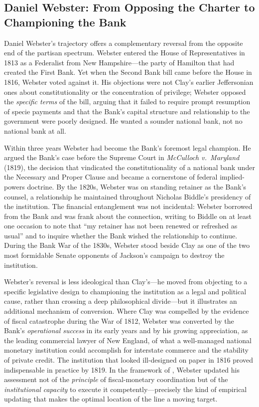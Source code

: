 \documentclass[12pt]{article}
\begin{document}
\subsection{Daniel Webster: From Opposing the Charter to Championing
             the Bank}

Daniel Webster's trajectory offers a complementary reversal from the
opposite end of the partisan spectrum.  Webster entered the House of
Representatives in 1813 as a Federalist from New Hampshire---the party
of Hamilton that had created the First Bank.  Yet when the Second Bank
bill came before the House in 1816, Webster voted against it.  His
objections were not Clay's earlier Jeffersonian ones about
constitutionality or the concentration of privilege; Webster opposed the
\emph{specific terms} of the bill, arguing that it failed to require
prompt resumption of specie payments and that the Bank's capital
structure and relationship to the government were poorly designed.  He
wanted a sounder national bank, not no national bank at all.

Within three years Webster had become the Bank's foremost legal
champion.  He argued the Bank's case before the Supreme Court in
\textit{McCulloch v.~Maryland} (1819), the decision that vindicated
the constitutionality of a national bank under the Necessary and Proper
Clause and became a cornerstone of federal implied-powers doctrine.
By the 1820s, Webster was on standing retainer as the Bank's counsel, a
relationship he maintained throughout Nicholas Biddle's presidency of
the institution.  The financial entanglement was not incidental: Webster
borrowed from the Bank and was frank about the connection, writing to
Biddle on at least one occasion to note that ``my retainer has not been
renewed or refreshed as usual'' and to inquire whether the Bank wished
the relationship to continue.  During the Bank War of the 1830s, Webster
stood beside Clay as one of the two most formidable Senate opponents of
Jackson's campaign to destroy the institution.

Webster's reversal is less ideological than Clay's---he moved from
objecting to a specific legislative design to championing the
institution as a legal and political cause, rather than crossing a deep
philosophical divide---but it illustrates an additional mechanism of
conversion.  Where Clay was compelled by the evidence of fiscal
catastrophe during the War of 1812, Webster was converted by the Bank's
\emph{operational success} in its early years and by his growing
appreciation, as the leading commercial lawyer of New England, of what
a well-managed national monetary institution could accomplish for
interstate commerce and the stability of private credit.  The
institution that looked ill-designed on paper in 1816 proved
indispensable in practice by 1819.  In the framework of
\citet{Sargent2011}, Webster updated his assessment not of the
\emph{principle} of fiscal-monetary coordination but of the
\emph{institutional capacity} to execute it competently---precisely
the kind of empirical updating that makes the optimal location of the
line a moving target.
\end{document}
